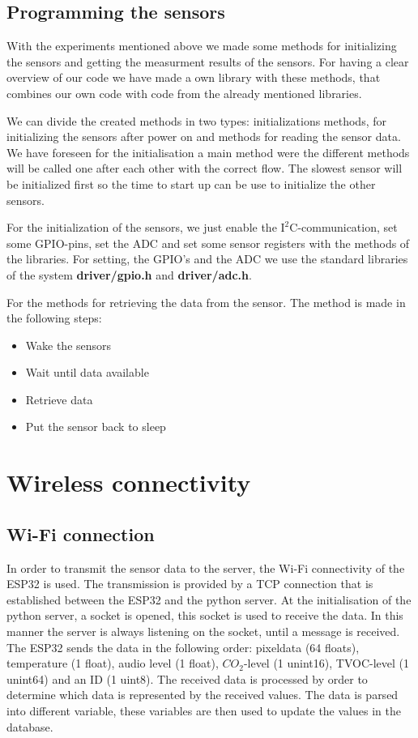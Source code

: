 \documentclass[11pt,a4paper]{article}
\begin{document}
\subsection{Programming the sensors}
With the experiments mentioned above we made some methods for initializing the sensors and getting the measurment results of the sensors. For having a clear overview of our code we have made a own library with these methods, that combines our own code with code from the already mentioned libraries.  

We can divide the created methods in two types: initializations methods, for initializing the sensors after power on and methods for reading the sensor data. We have foreseen for the initialisation a main method were the different methods will be called one after each other with the correct flow. The slowest sensor will be initialized first so the time to start up can be use to initialize the other sensors.

For the initialization of the sensors, we just enable the $\text{I}^2$C-communication, set some GPIO-pins, set the ADC and set some sensor registers with the methods of the libraries. For setting, the GPIO's and the ADC we use the standard libraries of the system \textbf{driver/gpio.h}  and \textbf{driver/adc.h}.

For the methods for retrieving the data from the sensor. The method is made in the following steps:
\begin{itemize}
\item Wake the sensors
\item Wait until data available
\item Retrieve data
\item Put the sensor back to sleep
\end{itemize}


\section{Wireless connectivity}
\subsection{Wi-Fi connection} \label{wifiCon}
In order to transmit the sensor data to the server, the Wi-Fi connectivity of the ESP32 is used. The transmission is provided by a TCP connection that is established between the ESP32 and the python server. At the initialisation of the python server, a socket is opened, this socket is used to receive the data. In this manner the server is always listening on the socket, until a message is received. The ESP32 sends the data in the following order: pixeldata (64 floats), temperature (1 float), audio level (1 float), $CO_2$-level (1 unint16), TVOC-level (1 unint64) and an ID (1 uint8). The received data is processed by order to determine which data is represented by the received values. The data is parsed into different variable, these variables are then used to update the values in the database. 
\end{document}
